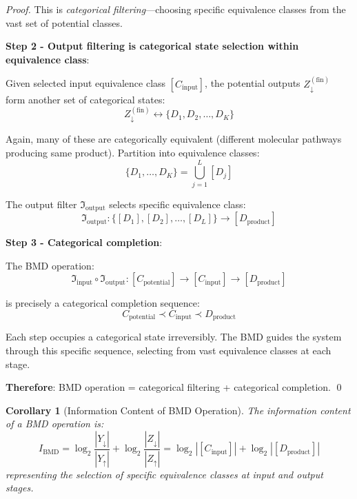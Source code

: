 \documentclass[12pt,a4paper]{article}
\newtheorem{corollary}{Corollary}
\begin{document}
\begin{proof}
This is \textit{categorical filtering}—choosing specific equivalence classes from the vast set of potential classes.

\textbf{Step 2 - Output filtering is categorical state selection within equivalence class}:

Given selected input equivalence class $[C_{\text{input}}]$, the potential outputs $Z_{\downarrow}^{(\text{fin})}$ form another set of categorical states:
\begin{equation}
Z_{\downarrow}^{(\text{fin})} \leftrightarrow \{D_1, D_2, \ldots, D_K\}
\end{equation}

Again, many of these are categorically equivalent (different molecular pathways producing same product). Partition into equivalence classes:
\begin{equation}
\{D_1, \ldots, D_K\} = \bigcup_{j=1}^L [D_j]
\end{equation}

The output filter $\Im_{\text{output}}$ selects specific equivalence class:
\begin{equation}
\Im_{\text{output}}: \{[D_1], [D_2], \ldots, [D_L]\} \to [D_{\text{product}}]
\end{equation}

\textbf{Step 3 - Categorical completion}:

The BMD operation:
\begin{equation}
\Im_{\text{input}} \circ \Im_{\text{output}}: [C_{\text{potential}}] \to [C_{\text{input}}] \to [D_{\text{product}}]
\end{equation}

is precisely a categorical completion sequence:
\begin{equation}
C_{\text{potential}} \prec C_{\text{input}} \prec D_{\text{product}}
\end{equation}

Each step occupies a categorical state irreversibly. The BMD guides the system through this specific sequence, selecting from vast equivalence classes at each stage.

\textbf{Therefore}: BMD operation = categorical filtering + categorical completion. \qed
\end{proof}

\begin{corollary}[Information Content of BMD Operation]
\label{cor:bmd_information}
The information content of a BMD operation is:
\begin{equation}
I_{\text{BMD}} = \log_2 \frac{|Y_{\downarrow}|}{|Y_{\uparrow}|} + \log_2 \frac{|Z_{\downarrow}|}{|Z_{\uparrow}|} = \log_2 |[C_{\text{input}}]| + \log_2 |[D_{\text{product}}]|
\end{equation}
representing the selection of specific equivalence classes at input and output stages.
\end{corollary}
\end{document}
